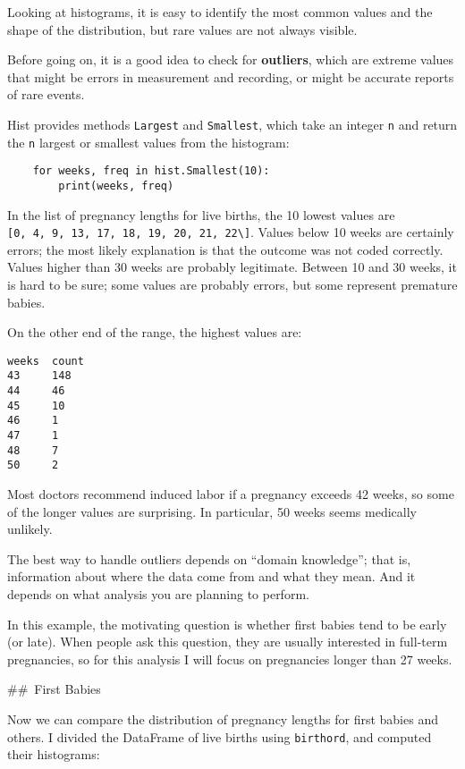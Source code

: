 \documentclass[]{book}
\begin{document}
Looking at histograms, it is easy to
identify the most common values and the shape of the distribution, but
rare values are not always visible.

Before going on, it is a good idea to
check for \textbf{outliers}, which are
extreme values that might be errors in measurement and recording, or
might be accurate reports of rare events.

Hist provides methods \texttt{Largest} and \texttt{Smallest}, which take an integer
\texttt{n} and return the \texttt{n} largest or smallest values from
the histogram:

\begin{verbatim}
    for weeks, freq in hist.Smallest(10):
        print(weeks, freq)
\end{verbatim}

In the list of pregnancy lengths for live
births, the 10 lowest values are \texttt{{[}0,\ 4,\ 9,\ 13,\ 17,\ 18,\ 19,\ 20,\ 21,\ 22\textbackslash{}{]}}. Values below 10 weeks are certainly errors; the most likely
explanation is that the outcome was not coded correctly. Values higher
than 30 weeks are probably legitimate. Between 10 and 30 weeks, it is
hard to be sure; some values are probably errors, but some represent
premature babies.

On the other end of the range, the
highest values are:

\begin{verbatim}
weeks  count
43     148
44     46
45     10
46     1
47     1
48     7
50     2
\end{verbatim}

Most doctors recommend induced labor if a
pregnancy exceeds 42 weeks, so some of the longer values are surprising.
In particular, 50 weeks seems medically unlikely.

The best way to handle outliers depends
on ``domain knowledge''; that is, information about where the data come
from and what they mean. And it depends on what analysis you are
planning to perform.

In this example, the motivating question
is whether first babies tend to be early (or late). When people ask this
question, they are usually interested in full-term pregnancies, so for
this analysis I will focus on pregnancies longer than 27 weeks.

\#\#~First Babies

Now we can compare the distribution of
pregnancy lengths for first babies and others. I divided the DataFrame
of live births using \texttt{birthord}, and computed their
histograms:
\end{document}
